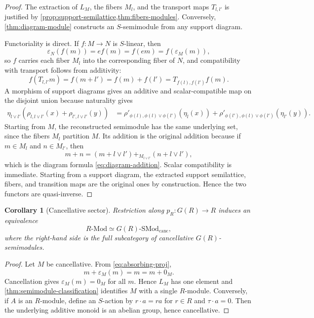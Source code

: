 \documentclass[11pt]{article}
\newcommand{\eps}{\varepsilon}
\newcommand{\1}{\mathbf 1}
\newcommand{\SMod}{\mathrm{SMod}}
\newcommand{\canc}{\mathrm{canc}}
\newtheorem{corollary}[theorem]{Corollary}
\numberwithin{equation}{section}
\begin{document}
\begin{proof}
The extraction of $L_M$, the fibers $M_l$, and the transport maps $T_{l,l'}$ is justified by \cref{prop:support-semilattice,thm:fibers-modules}.  Conversely, \cref{thm:diagram-module} constructs an $S$-semimodule from any support diagram.

Functoriality is direct.  If $f:M\to N$ is $S$-linear, then
\begin{equation}
  \eps_N(f(m))=ef(m)=f(em)=f(\eps_M(m)),
\end{equation}
so $f$ carries each fiber $M_l$ into the corresponding fiber of $N$, and compatibility with transport follows from additivity:
\begin{equation}
  f(T_{l,l'}m)=f(m+l')=f(m)+f(l')=T_{f(l),f(l')}f(m).
\end{equation}
A morphism of support diagrams gives an additive and scalar-compatible map on the disjoint union because naturality gives
\begin{align}
  \eta_{l\vee l'}(\rho_{l,l\vee l'}(x)+\rho_{l',l\vee l'}(y))
  &=\rho'_{\phi(l),\phi(l)\vee\phi(l')}(\eta_l(x))
  +\rho'_{\phi(l'),\phi(l)\vee\phi(l')}(\eta_{l'}(y)).
\end{align}
Starting from $M$, the reconstructed semimodule has the same underlying set, since the fibers $M_l$ partition $M$.  Its addition is the original addition because if $m\in M_l$ and $n\in M_{l'}$, then
\begin{equation}
  m+n=(m+l\vee l')+_{M_{l\vee l'}}(n+l\vee l'),
\end{equation}
which is the diagram formula \eqref{eq:diagram-addition}.  Scalar compatibility is immediate.  Starting from a support diagram, the extracted support semilattice, fibers, and transition maps are the original ones by construction.  Hence the two functors are quasi-inverse.
\end{proof}

\begin{corollary}[Cancellative sector]\label{cor:cancellative-sector}
Restriction along $p_R:G(R)\to R$ induces an equivalence
\begin{equation}
  R\text{-}\mathrm{Mod}\simeq G(R)\text{-}\SMod_{\canc},
\end{equation}
where the right-hand side is the full subcategory of cancellative $G(R)$-semimodules.
\end{corollary}

\begin{proof}
Let $M$ be cancellative.  From \eqref{eq:absorbing-proj},
\begin{equation}
  m+\eps_M(m)=m=m+0_M.
\end{equation}
Cancellation gives $\eps_M(m)=0_M$ for all $m$.  Hence $L_M$ has one element and \cref{thm:semimodule-classification} identifies $M$ with a single $R$-module.  Conversely, if $A$ is an $R$-module, define an $S$-action by $r\cdot a=ra$ for $r\in R$ and $\tau\cdot a=0$.  Then the underlying additive monoid is an abelian group, hence cancellative.
\end{proof}
\end{document}
